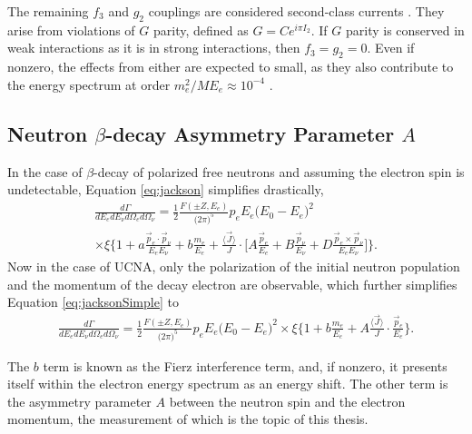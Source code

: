 The remaining $f_3$ and $g_2$ couplings are considered second-class currents \cite{weinberg1958charge}.
They arise from violations of $G$ parity, defined as $G = Ce^{i\pi I_2}$. If $G$ parity is conserved in
weak interactions as it is in strong interactions, then $f_3=g_2=0$. Even if nonzero, the effects
from either are expected to small, as they also contribute to the energy spectrum at order $m_e^2/ME_e \approx 10^{-4}$
\cite{holstein1974recoil,plaster2012}.


\subsection{Neutron $\beta$-decay Asymmetry Parameter $A$} \label{ssec:neutronAsymmParam}

In the case of $\beta$-decay of polarized free neutrons and assuming the electron spin is undetectable,
Equation \ref{eq:jackson} simplifies drastically,
%
\begin{multline}
  \frac{d\Gamma}{dE_e dE_\nu d\Omega_e d\Omega_\nu} = \frac{1}{2} \frac{F(\pm Z, E_e)}{\big( 2\pi \big)^5}
  p_e E_e \big( E_0 - E_e \big)^2 \\ \times \xi 
  \Bigg\{ 1 + a\frac{\vec{p}_e \cdot \vec{p}_\nu}{E_e E_\nu} + b\frac{m_e}{E_e} 
  + \frac{\langle \vec{J} \rangle}{J} \cdot \Bigg[ A\frac{\vec{p}_e}{E_e}
    + B\frac{\vec{p}_\nu}{E_\nu} + D\frac{\vec{p}_e \times \vec{p}_\nu}{E_e E_\nu}\Bigg]
  \Bigg\}.
  \label{eq:jacksonSimple}
\end{multline}
%
Now in the case of UCNA, only the polarization of the initial neutron population and the momentum
of the decay electron are observable, which further simplifies Equation \ref{eq:jacksonSimple} to
%
\begin{multline}
  \frac{d\Gamma}{dE_e dE_\nu d\Omega_e d\Omega_\nu} = \frac{1}{2} \frac{F(\pm Z, E_e)}{\big( 2\pi \big)^5}
  p_e E_e \big( E_0 - E_e \big)^2 \times \xi 
  \Bigg\{ 1 + b\frac{m_e}{E_e} 
  + A \frac{\langle \vec{J} \rangle}{J} \cdot \frac{\vec{p}_e}{E_e}
  \Bigg\}.
  \label{eq:jacksonSimple2}
\end{multline}
%

The $b$ term is known as the Fierz interference term, and, if nonzero, it presents itself
within the electron energy spectrum as an energy shift. The other term is the asymmetry parameter
$A$ between the neutron spin and the electron momentum, the measurement of which is the topic of
this thesis.

